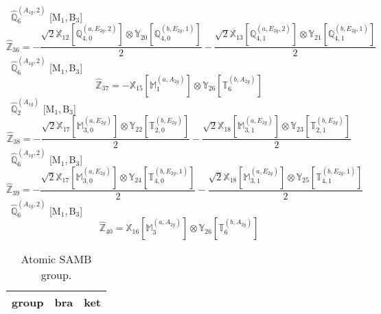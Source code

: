 \documentclass[fleqn,10pt,landscape]{article}
\begin{document}
\begin{itemize}
\begin{dmath*}
\end{dmath*}
\vspace{4mm}
\noindent {} $\,\,\,\hat{\mathbb{Q}}_{6}^{(A_{1g},2)}$ [M$_{1}$,\,B$_{3}$]
\begin{dmath*}
\hat{\mathbb{Z}}_{36}=- \frac{\sqrt{2} \mathbb{X}_{12}[\mathbb{Q}_{4,0}^{(a,E_{2g},2)}] \otimes\mathbb{Y}_{20}[\mathbb{Q}_{4,0}^{(b,E_{2g},1)}]}{2} - \frac{\sqrt{2} \mathbb{X}_{13}[\mathbb{Q}_{4,1}^{(a,E_{2g},2)}] \otimes\mathbb{Y}_{21}[\mathbb{Q}_{4,1}^{(b,E_{2g},1)}]}{2}
\end{dmath*}
\vspace{4mm}
\noindent {} $\,\,\,\hat{\mathbb{Q}}_{6}^{(A_{1g},2)}$ [M$_{1}$,\,B$_{3}$]
\begin{dmath*}
\hat{\mathbb{Z}}_{37}=- \mathbb{X}_{15}[\mathbb{M}_{1}^{(a,A_{2g})}] \otimes\mathbb{Y}_{26}[\mathbb{T}_{6}^{(b,A_{2g})}]
\end{dmath*}
\vspace{4mm}
\noindent {} $\,\,\,\hat{\mathbb{Q}}_{2}^{(A_{1g})}$ [M$_{1}$,\,B$_{3}$]
\begin{dmath*}
\hat{\mathbb{Z}}_{38}=- \frac{\sqrt{2} \mathbb{X}_{17}[\mathbb{M}_{3,0}^{(a,E_{2g})}] \otimes\mathbb{Y}_{22}[\mathbb{T}_{2,0}^{(b,E_{2g})}]}{2} - \frac{\sqrt{2} \mathbb{X}_{18}[\mathbb{M}_{3,1}^{(a,E_{2g})}] \otimes\mathbb{Y}_{23}[\mathbb{T}_{2,1}^{(b,E_{2g})}]}{2}
\end{dmath*}
\vspace{4mm}
\noindent {} $\,\,\,\hat{\mathbb{Q}}_{6}^{(A_{1g},2)}$ [M$_{1}$,\,B$_{3}$]
\begin{dmath*}
\hat{\mathbb{Z}}_{39}=- \frac{\sqrt{2} \mathbb{X}_{17}[\mathbb{M}_{3,0}^{(a,E_{2g})}] \otimes\mathbb{Y}_{24}[\mathbb{T}_{4,0}^{(b,E_{2g},1)}]}{2} - \frac{\sqrt{2} \mathbb{X}_{18}[\mathbb{M}_{3,1}^{(a,E_{2g})}] \otimes\mathbb{Y}_{25}[\mathbb{T}_{4,1}^{(b,E_{2g},1)}]}{2}
\end{dmath*}
\vspace{4mm}
\noindent {} $\,\,\,\hat{\mathbb{Q}}_{6}^{(A_{1g},2)}$ [M$_{1}$,\,B$_{3}$]
\begin{dmath*}
\hat{\mathbb{Z}}_{40}=\mathbb{X}_{16}[\mathbb{M}_{3}^{(a,A_{2g})}] \otimes\mathbb{Y}_{26}[\mathbb{T}_{6}^{(b,A_{2g})}]
\end{dmath*}
\begin{center}
\renewcommand{\arraystretch}{1.3}
\begin{longtable}{c|c|c}
\caption{Atomic SAMB group.}
 \\
 \hline \hline
group & bra & ket \\ \hline \endfirsthead


\end{longtable}
\end{center}
\end{itemize}
\end{document}
